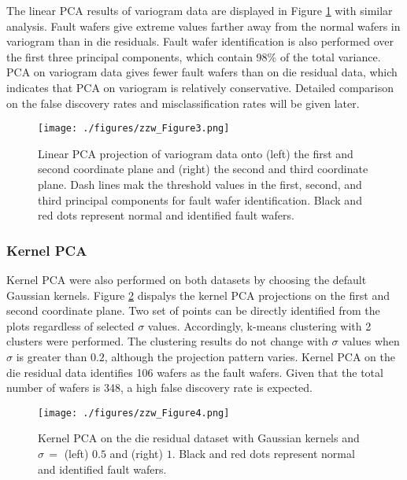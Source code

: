 \documentclass[english]{article}
\numberwithin{equation}{section}
\numberwithin{table}{section}
\numberwithin{figure}{section}
\begin{document}
The linear PCA results of variogram data are displayed in Figure \ref{fig:3}
with similar analysis. Fault wafers give extreme values farther away
from the normal wafers in variogram than in die residuals. Fault wafer
identification is also performed over the first three principal components,
which contain 98\% of the total variance. PCA on variogram data gives
fewer fault wafers than on die residual data, which indicates that
PCA on variogram is relatively conservative. Detailed comparison on
the false discovery rates and misclassification rates will be given
later.

\begin{figure}[!tph]
\begin{centering}
\texttt{[image: ./figures/zzw\_Figure3.png]}
\par\end{centering}

\caption{Linear PCA projection of variogram data onto (left) the first and
second coordinate plane and (right) the second and third coordinate
plane. Dash lines mak the threshold values in the first, second, and
third principal components for fault wafer identification. Black and
red dots represent normal and identified fault wafers.\label{fig:3}}
\end{figure}




\subsubsection{Kernel PCA}
\hspace{12 pt}
Kernel PCA were also performed on both datasets by choosing the default
Gaussian kernels. Figure \ref{fig:4} dispalys the kernel PCA projections
on the first and second coordinate plane. Two set of points can be
directly identified from the plots regardless of selected $\sigma$
values. Accordingly, k-means clustering with 2 clusters were performed.
The clustering results do not change with $\sigma$ values when $\sigma$
is greater than $0.2$, although the projection pattern varies. Kernel
PCA on the die residual data identifies 106 wafers as the fault wafers.
Given that the total number of wafers is 348, a high false discovery
rate is expected.

\begin{figure}[!tph]
\begin{centering}
\texttt{[image: ./figures/zzw\_Figure4.png]}
\par\end{centering}

\caption{Kernel PCA on the die residual dataset with Gaussian kernels and $\sigma\,=$
(left) $0.5$ and (right) $1$. Black and red dots represent normal
and identified fault wafers.\label{fig:4}}
\end{figure}
\end{document}
